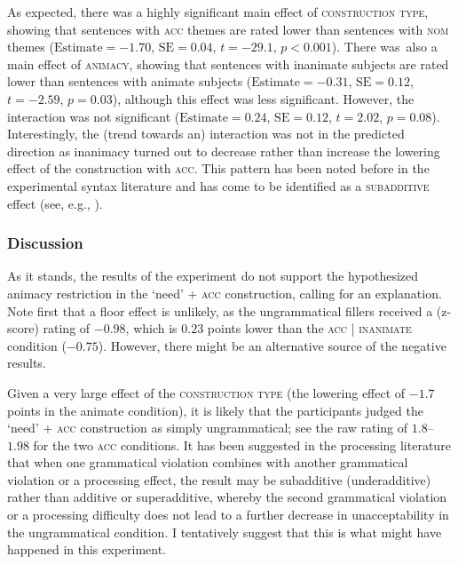 \documentclass[output=paper]{langscibook}
\begin{document}
As expected, there was a highly significant main effect of \textsc{construction type}, showing that sentences with \textsc{acc} themes are rated lower than sentences with \textsc{nom} themes ($\text{Estimate} = -1.70$, $\text{SE} = 0.04$, $t = -29.1$, $p < 0.001$). There was~also a main effect of \textsc{animacy}, showing that sentences with inanimate subjects are rated lower than sentences with animate subjects ($\text{Estimate} = -0.31$, $\text{SE} = 0.12$,  $t = -2.59$, $p = 0.03$), although this effect was less significant. However, the interaction was not significant ($\text{Estimate} = 0.24$, $\text{SE} = 0.12$, $t = 2.02$, $p = 0.08$). Interestingly, the (trend towards an) interaction was not in the predicted direction as inanimacy turned out to decrease rather than increase the lowering effect of the construction with \textsc{acc}. This pattern has been noted before in the experimental syntax literature and has come to be identified as a \textsc{subadditive} effect (see, e.g., \citealt{Stepanov.Music.Stateva2018}).

\subsubsection{Discussion}

As it stands, the results of the experiment do not support the hypothesized animacy restriction in the `need' + \textsc{acc} construction, calling for an explanation. Note first that a floor effect is unlikely, as the ungrammatical fillers received a (z-score) rating of $-0.98$, which is $0.23$ points lower than the \textsc{acc} | \textsc{inanimate} condition ($-0.75$). However, there might be an alternative source of the negative results.

Given a very large effect of the \textsc{construction type} (the lowering effect of $-1.7$ points in the animate condition), it is likely that the participants judged the `need' + \textsc{acc} construction as simply ungrammatical; see the raw rating of $1.8$--$1.98$ for the two \textsc{acc} conditions. It has been suggested in the processing literature \citep[see][]{Hofmeister.Casasanto.Staum.Sag2014} that when one grammatical violation combines with another grammatical violation or a processing effect, the result may be subadditive (underadditive) rather than additive or superadditive, whereby the second grammatical violation or a processing difficulty does not lead to a further decrease in unacceptability in the ungrammatical condition. I tentatively suggest that this is what might have happened in this experiment.
\end{document}

